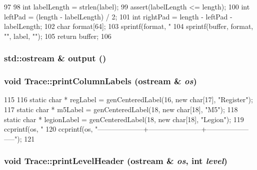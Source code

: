 \begin{DoxyCode}
97 {
98     int labelLength = strlen(label);
99     assert(labelLength <= length);
100     int leftPad = (length - labelLength) / 2;
101     int rightPad = length - leftPad - labelLength;
102     char format[64];
103     sprintf(format, "%
104     sprintf(buffer, format, "", label, "");
105     return buffer;
106 }
\end{DoxyCode}
\hypertarget{namespaceTrace_a926e8ac599a26341584088a3d3eec751}{
\subsubsection[{output}]{\setlength{\rightskip}{0pt plus 5cm}std::ostream \& output ()}}
\label{namespaceTrace_a926e8ac599a26341584088a3d3eec751}
\hypertarget{namespaceTrace_ae49f34c38f6236671a5f24356a57390f}{
\subsubsection[{printColumnLabels}]{\setlength{\rightskip}{0pt plus 5cm}void Trace::printColumnLabels (ostream \& {\em os})}}
\label{namespaceTrace_ae49f34c38f6236671a5f24356a57390f}



\begin{DoxyCode}
115 {
116     static char * regLabel = genCenteredLabel(16, new char[17], "Register");
117     static char * m5Label = genCenteredLabel(18, new char[18], "M5");
118     static char * legionLabel = genCenteredLabel(18, new char[18], "Legion");
119     ccprintf(os, "  %
120     ccprintf(os, "--------------------+-----------------------+------------------
      -----\n");
121 }
\end{DoxyCode}
\hypertarget{namespaceTrace_a875823c92c10db29fa8bdbd50c699519}{
\subsubsection[{printLevelHeader}]{\setlength{\rightskip}{0pt plus 5cm}void Trace::printLevelHeader (ostream \& {\em os}, \/  int {\em level})}}
\label{namespaceTrace_a875823c92c10db29fa8bdbd50c699519}



